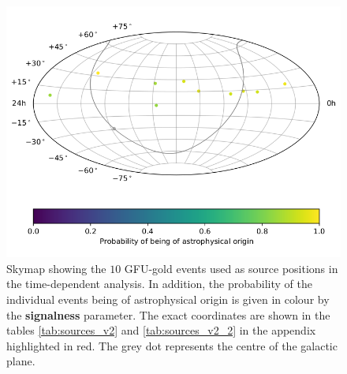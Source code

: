\begin{figure}
    \centering
    \includegraphics[draft=false,width=\linewidth]{Plots/02_sources/gfu_gold_skymap_time_dep.png} %
    \caption{Skymap showing the $\num{10}$ GFU-gold events used as source positions in the time-dependent analysis. In addition, the probability of the individual events being of astrophysical origin is given in colour by the \textbf{signalness} parameter. The exact coordinates are shown in the tables \ref{tab:sources_v2} and \ref{tab:sources_v2_2} in the appendix highlighted in red. The grey dot represents the centre of the galactic plane.}
    \label{fig:skymap_2}
\end{figure}

%    
%    
